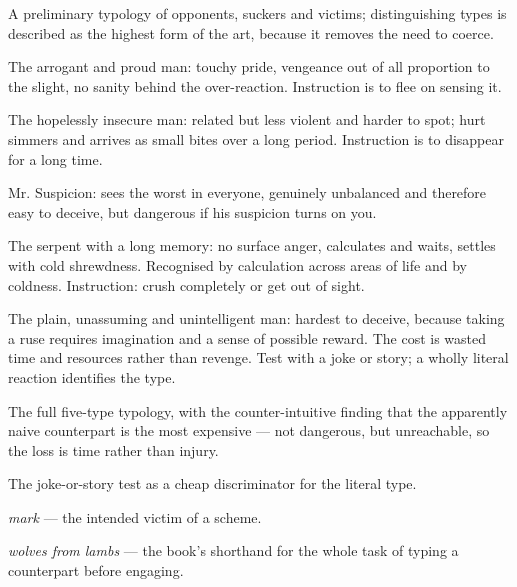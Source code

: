 

\begin{distilled}
  \item A preliminary typology of opponents, suckers and victims; distinguishing types is described as the highest form of the art, because it removes the need to coerce.
  \item The arrogant and proud man: touchy pride, vengeance out of all proportion to the slight, no sanity behind the over-reaction. Instruction is to flee on sensing it.
  \item The hopelessly insecure man: related but less violent and harder to spot; hurt simmers and arrives as small bites over a long period. Instruction is to disappear for a long time.
  \item Mr. Suspicion: sees the worst in everyone, genuinely unbalanced and therefore easy to deceive, but dangerous if his suspicion turns on you.
  \item The serpent with a long memory: no surface anger, calculates and waits, settles with cold shrewdness. Recognised by calculation across areas of life and by coldness. Instruction: crush completely or get out of sight.
  \item The plain, unassuming and unintelligent man: hardest to deceive, because taking a ruse requires imagination and a sense of possible reward. The cost is wasted time and resources rather than revenge. Test with a joke or story; a wholly literal reaction identifies the type.
\end{distilled}

\begin{unique}
  \item The full five-type typology, with the counter-intuitive finding that the apparently naive counterpart is the most expensive --- not dangerous, but unreachable, so the loss is time rather than injury.
  \item The joke-or-story test as a cheap discriminator for the literal type.
\end{unique}

\begin{terms}
  \item \emph{mark} --- the intended victim of a scheme.
  \item \emph{wolves from lambs} --- the book's shorthand for the whole task of typing a counterpart before engaging.
\end{terms}
